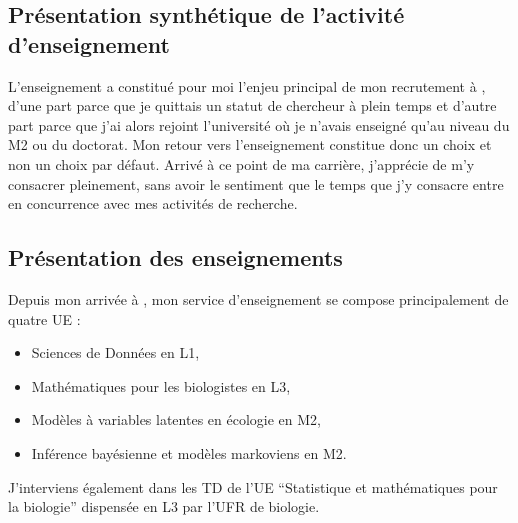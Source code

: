 \subsection{Présentation synthétique de l'activité d'enseignement}

L’enseignement a constitué pour moi l’enjeu principal de mon recrutement à \SU, d’une part parce que je quittais un statut de chercheur à plein temps et d’autre part parce que j’ai alors rejoint l’université où je n’avais enseigné qu’au niveau du M2 ou du doctorat.
Mon retour vers l'enseignement constitue donc un choix et non un choix par défaut.
Arrivé à ce point de ma carrière, j'apprécie de m'y consacrer pleinement, sans avoir le sentiment que le temps que j'y consacre entre en concurrence avec mes activités de recherche.

\subsection{Présentation des enseignements}

Depuis mon arrivée à \SU, mon service d’enseignement se compose principalement de quatre UE :
\begin{itemize}
\item Sciences de Données en L1,
\item Mathématiques pour les biologistes en L3,
\item Modèles à variables latentes en écologie en M2,
\item Inférence bayésienne et modèles markoviens en M2. 
\end{itemize}
J’interviens également dans les TD de l'UE “Statistique et mathématiques pour la biologie'' dispensée en L3 par l’UFR de biologie. 


